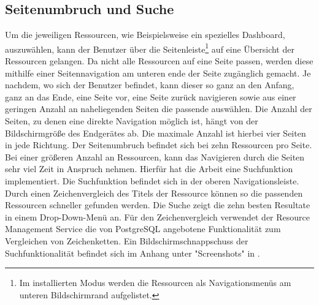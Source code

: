 \subsection{Seitenumbruch und Suche}
\label{subsec:seitenumbruchundsuche}
Um die jeweiligen Ressourcen, wie Beispielsweise ein spezielles Dashboard, auszuwählen, kann der Benutzer über
die Seitenleiste\footnote{Im installierten Modus werden die Ressourcen als Navigationsmenüs am unteren Bildschirmrand aufgelistet.}
auf eine Übersicht der Ressourcen gelangen. Da nicht alle Ressourcen auf eine Seite passen, werden diese mithilfe
einer Seitennavigation am unteren ende der Seite zugänglich gemacht. Je nachdem, wo sich der Benutzer befindet,
kann dieser so ganz an den Anfang, ganz an das Ende, eine Seite vor, eine Seite zurück navigieren sowie aus einer geringen Anzahl
an naheliegenden Seiten die passende auswählen. Die Anzahl der Seiten, zu denen eine direkte Navigation möglich ist, hängt von
der Bildschirmgröße des Endgerätes ab. Die maximale Anzahl ist hierbei vier Seiten in jede Richtung. Der Seitenumbruch befindet sich
bei zehn Ressourcen pro Seite. Bei einer größeren Anzahl an Ressourcen, kann das Navigieren durch
die Seiten sehr viel Zeit in Anspruch nehmen. Hierfür hat die Arbeit eine Suchfunktion implementiert. Die Suchfunktion befindet sich
in der oberen Navigationsleiste. Durch einen Zeichenvergleich des Titels der Ressource können so die passenden Ressourcen schneller gefunden
werden. Die Suche zeigt die zehn besten Resultate in einem Drop-Down-Menü an. Für den Zeichenvergleich verwendet der Resource Management Service
die von PostgreSQL angebotene Funktionalität zum Vergleichen von Zeichenketten. Ein Bildschirmschnappschuss der Suchfunktionalität befindet sich
im Anhang unter "Screenshots" in .

